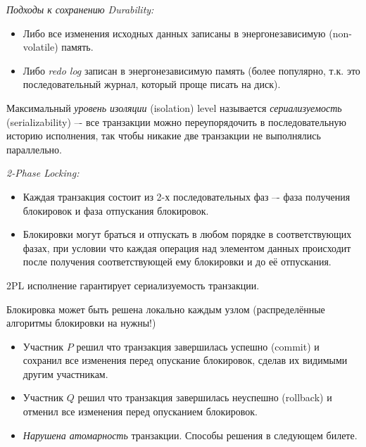 \begin{algorithm} \textit{Подходы к сохранению Durability:}
    \begin{itemize}
        \item Либо все изменения исходных данных записаны в энергонезависимую (non-volatile) память.
        \item Либо \textit{redo log} записан в энергонезависимую память
            (более популярно, т.к. это последовательный журнал, который проще писать на диск).
    \end{itemize}
\end{algorithm}

\begin{definition}
    Максимальный \textit{уровень изоляции} (isolation) level называется
    \textit{сериализуемость} (serializability) –- все транзакции можно переупорядочить в
    последовательную историю исполнения, так чтобы никакие две транзакции не выполнялись параллельно.
\end{definition}

\begin{definition} \textit{2-Phase Locking:}
    \begin{itemize}
        \item Каждая транзакция состоит из 2-х последовательных фаз –-
            фаза получения блокировок и фаза отпускания блокировок.
        \item Блокировки могут браться и отпускать в любом порядке в
            соответствующих фазах, при условии что каждая операция над
            элементом данных происходит после получения соответствующей ему блокировки и до её отпускания.
    \end{itemize}
\end{definition}

\begin{remark}
    2PL исполнение гарантирует сериализуемость транзакции.
\end{remark}

\begin{remark}
    Блокировка может быть решена локально каждым узлом (распределённые алгоритмы блокировки на нужны!)
\end{remark}

\begin{example}
    \enewline
    \begin{itemize}
        \item Участник $P$ решил что транзакция завершилась успешно (commit)
            и сохранил все изменения перед опускание блокировок, сделав
            их видимыми другим участникам.
        \item Участник $Q$ решил что транзакция завершилась неуспешно
            (rollback) и отменил все изменения перед опусканием блокировок.
        \item \textit{Нарушена атомарность} транзакции. Способы решения в следующем билете.
    \end{itemize}
\end{example}

